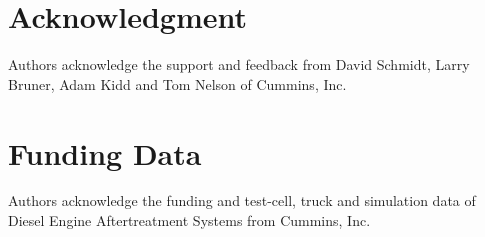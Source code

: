 \documentclass[subscriptcorrection,upint,varvw,barcolor=Goldenrod3,mathalfa=cal=euler,balance,hyphenate,french,pdf-a]{asmejour}
\begin{document}
\section*{Acknowledgment}
Authors acknowledge the support and feedback from David Schmidt, Larry Bruner, Adam Kidd and Tom Nelson of Cummins, Inc.
\section*{Funding Data}
Authors acknowledge the funding and test-cell, truck and simulation data of Diesel Engine Aftertreatment Systems from Cummins, Inc.
\appendix   %



\end{document}
